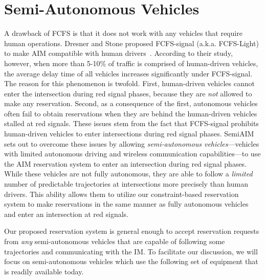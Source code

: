 \section{Semi-Autonomous Vehicles}
\label{sec:vehicles}

A drawback of FCFS is that it does not work with any vehicles that
require human operations.  Dresner and Stone proposed FCFS-signal
(a.k.a. FCFS-Light) to make AIM compatible with human
drivers~\cite{bib:Dresner07Sharing}.  According to their study,
however, when more than 5-10\% of traffic is comprised of human-driven
vehicles, the average delay time of all vehicles increases
significantly under FCFS-signal.  The reason for this phenomenon is
twofold.  First, human-driven vehicles cannot enter the intersection
during red signal phases, because they are \emph{not} allowed to make
any reservation.  Second, as a consequence of the first, autonomous
vehicles often fail to obtain reservations when they are behind the
human-driven vehicles stalled at red signals. These issues stem from
the fact that FCFS-signal prohibits human-driven vehicles to enter
intersections during red signal phases. SemiAIM sets out to overcome
these issues by allowing \emph{semi-autonomous vehicles}---vehicles
with limited autonomous driving and wireless communication
capabilities---to use the AIM reservation system to enter an
intersection during red signal phases.  While these vehicles are not
fully autonomous, they are able to follow a \emph{limited} number of
predictable trajectories at intersections more precisely than human
drivers.  This ability allows them to utilize our constraint-based
reservation system to make reservations in the same manner as fully
autonomous vehicles and enter an intersection at red signals.

Our proposed reservation system is general enough to accept
reservation requests from \emph{any} semi-autonomous vehicles that are
capable of following some trajectories and communicating with the IM.
To facilitate our discussion, we will focus on semi-autonomous
vehicles which use the following set of equipment that is readily
available today.

